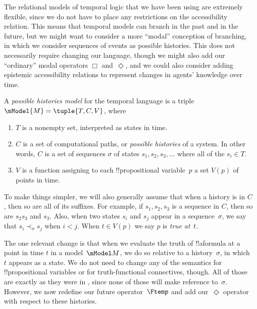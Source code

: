 \documentclass[../../../include/open-logic-section]{subfiles}
\begin{document}


The relational models of temporal logic that we have been using are extremely flexible, since we do not have to place
any restrictions on the accessibility relation. This means that temporal models can branch in the past and in the future,
but we might want to consider a more ``modal'' conception of branching, in which we consider sequences of events
as possible histories. This does not necessarily require changing our language, though we might also add our ``ordinary''
modal operators $\Box$ and~$\Diamond$, and we could also consider adding epistemic accessibility relations to 
represent changes in agents' knowledge over time.

\begin{defn}
  A \emph{possible histories model} for the temporal language is a triple
  $\mModel{M} = \tuple{T, C, V}$, where
  \begin{enumerate}
  \item $T$ is a nonempty set, interpreted as states in time.
  \item $C$ is a set of computational paths, or \emph{possible histories} of a system. In other
  words, $C$ is a set of sequences $\sigma$ of states $s_1, s_2, s_3, ...$ where all of the $s_i \in T$.
    \item $V$ is a function assigning to each !!{propositional variable}~$p$ a set $V(p)$ of points in time.
  \end{enumerate}
  To make things simpler, we will also generally assume that when a history is in $C$, then so are all of its suffixes. For example, if $s_1, s_2, s_3$ is a sequence in $C$, then so are $s_2 s_3$ and $s_3$. 
  Also, when two states $s_i$ and $s_j$ appear in a sequence~$\sigma$, we say that $s_i \prec_\sigma s_j$ when $i < j$. 
  When $t \in V(p)$ we say $p$ is \emph{true at}~$t$.
\end{defn}

The one relevant change is that when we evaluate the truth of
!!a{formula} at a point in time $t$ in a model~$\mModel M$, 
we do so relative to a history~$\sigma$, in which $t$ appears as a state. We do not need to change any of the semantics for !!{propositional variable}s or for truth-functional connectives, though. All of those are exactly as they were in , since none of those will make reference to~$\sigma$. However, we now redefine our future operator~$\Ftemp$ and add our~$\Diamond$ operator with respect to these histories. 
\end{document}

